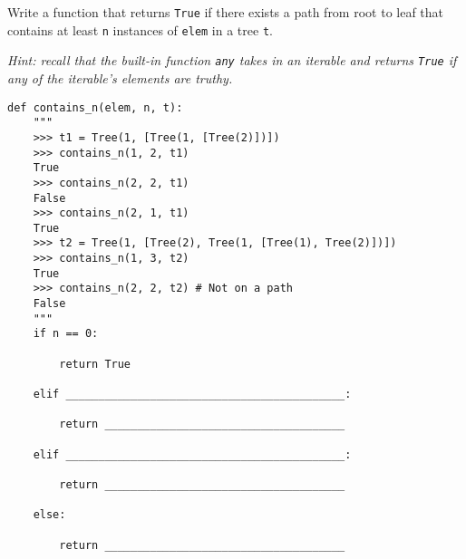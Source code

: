 \begin{blocksection}
\question Write a function that returns \lstinline{True} if there exists a path from root to leaf that contains at least \lstinline{n} instances of \lstinline{elem} in a tree \lstinline{t}.

\textit{Hint: recall that the built-in function \lstinline{any} takes in an iterable and returns \lstinline{True} if any of the iterable's elements are truthy. }

\begin{lstlisting}
def contains_n(elem, n, t):
    """
    >>> t1 = Tree(1, [Tree(1, [Tree(2)])])
    >>> contains_n(1, 2, t1)
    True
    >>> contains_n(2, 2, t1)
    False
    >>> contains_n(2, 1, t1)
    True
    >>> t2 = Tree(1, [Tree(2), Tree(1, [Tree(1), Tree(2)])])
    >>> contains_n(1, 3, t2)
    True
    >>> contains_n(2, 2, t2) # Not on a path
    False
    """
    if n == 0:
		
        return True
				
    elif ___________________________________________:
		
        return _____________________________________
				
    elif ___________________________________________:
		
        return _____________________________________
				
    else:
    
        return _____________________________________
\end{lstlisting}
\end{blocksection}
